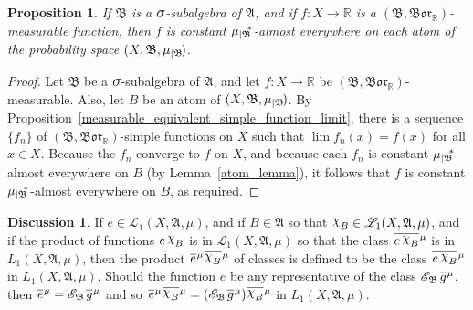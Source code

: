 \documentclass[
twoside=true,
paper=letter,
fontsize=9pt,
pagesize=auto,
leqno,
openany,
headsepline,
overfullrule,
]{scrbook}
\theoremstyle{plain}
\theoremstyle{plain}
\newtheorem{prop}[thm]{Proposition}
\theoremstyle{definition}
\newtheorem{discussion}[thm]{Discussion}
\theoremstyle{bfnoteitalic}
\theoremstyle{bfnoteroman}
\newcommand{\sigalg}[1]{\mathfrak{#1}}
\newcommand{\cali}[1]{\mathscr{#1}}
\newcommand{\condexpsub}[2]
{\mathop{\cali{E}\hspace{-1.5pt}}\nolimits_{#2}\hspace{-1pt}#1}
\newcommand{\borel}{\mathfrak{Bor}}
\newcommand{\textsigma}{\hbox{\large{$\sigma$}}\kern-1pt}
\newcommand{\charfunction}[1]{\mathop{{\raisebox{2pt}{$\chi$}}_{#1}}}
\newcommand{\restrictedto}[1]{_{\lvert#1}\kern-1.5pt}
\newcommand{\R}{\mathbb{R}}
\newcommand{\sigmaalgebra}{\sigalg{A}}
\newcommand{\sigmaalgebraii}{\sigalg{B}}
\newcommand{\Psubstar}[1]{\measure\restrictedto{#1}\kern-2pt^*}
\newcommand{\sigalgb}{\sigmaalgebraii}
\newcommand{\function}{f}
\newcommand{\functionii}{g}
\newcommand{\measurespace}{X}
\newcommand{\mspaceelt}{x}
\newcommand{\measure}{\mu}
\newcommand*\xbar[1]{%
   \hbox{%
     \vbox{%
       \hrule height 0.4pt %
       \kern0.4ex%
       \hbox{%
         \ensuremath{#1}%
       }%
     }%
   }%
}
\newcommand{\lebclass}[1]{\hspace{.5pt}\xbar{#1}\hspace{0.5pt}}
\newcommand{\ellclass}[2]{\lebclass{#1}^{#2}}
\begin{document}
\begin{prop}\label{constant_on_the_atoms}
If $\sigmaalgebraii$ is a $\textsigma$-subalgebra of $\sigmaalgebra$, and if  $\function:\measurespace\to\R$ is a $(\sigmaalgebraii, \borel_\R)$\hyp{}measurable function, then $\function$ is constant $\Psubstar{\sigalgb}$-almost everywhere on each atom of 
the probability space
$(\measurespace, \sigmaalgebraii,\measure\restrictedto{\sigmaalgebraii})$. 
\end{prop}

\begin{proof}
Let $\sigmaalgebraii$ be a $\textsigma$-subalgebra of $\sigmaalgebra$, and let $\function:\measurespace\to\R$ be $(\sigmaalgebraii, \borel_\R)$\hyp{}measurable. Also, let $B$ be an atom of $(\measurespace, \sigmaalgebraii,\measure\restrictedto{\sigmaalgebraii})$.  By Proposition~\ref{measurable_equivalent_simple_function_limit}, there is a sequence $\{\function_n\}$ of $(\sigmaalgebraii, \borel_\R)$-simple functions on $\measurespace$ such that 
$\lim  \function_n(\mspaceelt) = \function(\mspaceelt)$ for all $\mspaceelt\in\measurespace$. Because the $\function_n$ converge to $\function$ on $\measurespace$, and because  each $\function_n$ is constant $\Psubstar{\sigalgb}$-almost everywhere on $B$ (by Lemma~\ref{atom_lemma}), it follows that $\function$ is constant $\Psubstar{\sigalgb}$-almost everywhere on $B$, as required.
\end{proof}



\begin{discussion}
If $e\in\cali{L}_1(\measurespace, \sigmaalgebra,\measure)$, and if $B\in\sigmaalgebra$ so that $\charfunction{B}\in\cali{L}_1(\measurespace, \sigmaalgebra,\measure)$, and if the product of functions
$e\charfunction{B}$ is in $\cali{L}_1(\measurespace, \sigmaalgebra,\measure)$
so that the class $\ellclass{e\charfunction{B}}{\measure}$ is in 
$L_1(\measurespace, \sigmaalgebra,\measure)$, then the product 
$\ellclass{e}{\measure}\ellclass{\charfunction{B}}{\measure}$ 
of classes is defined to be the class 
$\ellclass{e\charfunction{B}}{\measure}$ in 
$L_1(\measurespace, \sigmaalgebra,\measure)$.
Should the function $e$ be any representative of the class 
$\condexpsub{\ellclass{\functionii}{\measure}}{\sigmaalgebraii}$, 
then $\ellclass{e}{\measure} = \condexpsub{\ellclass{\functionii}{\measure}}{\sigmaalgebraii}$
and so  
$\ellclass{e}{\measure}\ellclass{\charfunction{B}}{\measure} 
=
(\condexpsub{\ellclass{\functionii}{\measure}}{\sigmaalgebraii})\ellclass{\charfunction{B}}{\measure}$ 
in $L_1(\measurespace, \sigmaalgebra,\measure)$.
\end{discussion}
\end{document}
